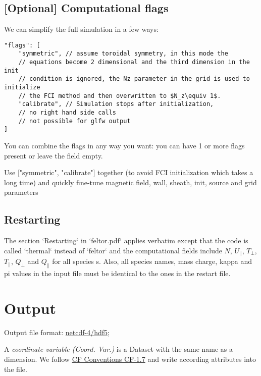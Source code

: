 \subsection{[Optional] Computational flags}
We can simplify the full simulation in a few ways:
\begin{verbatim}
"flags": [
    "symmetric", // assume toroidal symmetry, in this mode the
    // equations become 2 dimensional and the third dimension in the init
    // condition is ignored, the Nz parameter in the grid is used to initialize
    // the FCI method and then overwritten to $N_z\equiv 1$.
    "calibrate", // Simulation stops after initialization,
    // no right hand side calls
    // not possible for glfw output
]
\end{verbatim}
You can combine the flags in any way you want: you can have 1 or more
flags present or leave the field empty.
\begin{tcolorbox}[title=Note]
    Use ["symmetric", "calibrate"] together (to avoid FCI initialization
    which takes a long time) and quickly fine-tune
    magnetic field, wall, sheath, init, source and grid parameters
\end{tcolorbox}
\subsection{Restarting} \label{sec:restart}
The section `Restarting` in `feltor.pdf` applies verbatim except that the code is called `thermal` instead of `feltor` and the computational fields include
$N$, $U_\parallel$, $T_\perp$, $T_\parallel$, $Q_\perp$ and $Q_\parallel$ for all species s.
Also, all species names, mass charge, kappa and pi values in the input file must be identical to the ones in the restart file.

\section{Output} \label{sec:output_file}
Output file format: \href{https://www.unidata.ucar.edu/software/netcdf/docs/}{netcdf-4/hdf5};

A \textit{coordinate variable (Coord. Var.)} is a Dataset with the same name as a dimension.
We follow
\href{http://cfconventions.org/Data/cf-conventions/cf-conventions-1.7/cf-conventions.html}{CF Conventions CF-1.7}
and write according attributes into the file.


